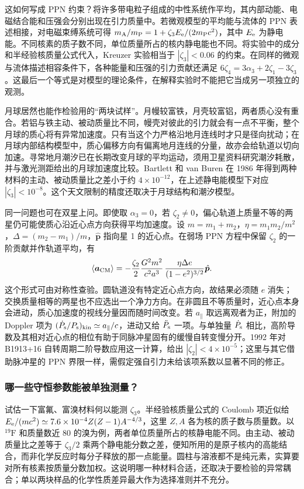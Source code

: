 这如何写成 PPN 约束？将许多带电粒子组成的中性系统作平均，其内部动能、电磁结合能和压强会分别出现在引力质量中。若微观模型的平均能与流体的 PPN 表述相接，对电磁束缚系统可得 $m_{\rm A}/m_{\rm P}=1+\zeta_3 E_{\rm e}/(2m_{\rm P}c^2)$，其中 $E_{\rm e}$ 为静电能。不同核素的质子数不同，单位质量所占的核内静电能也不同。将实验中的成分和半经验核质量公式代入，Kreuzer 实验相当于 $|\zeta_3|<0.06$ 的约束。在同样的微观与流体描述相容条件下，各种能量和压强的引力贡献还满足 $6\zeta_4=3\alpha_3+2\zeta_1-3\zeta_3$。这最后一个等式是对模型的理论条件，在解释实验时不能把它当成另一项独立的观测。

月球居然也能作检验用的“两块试样”。月幔较富铁，月壳较富铝，两者质心没有重合。若铝与铁主动、被动质量比不同，幔壳对彼此的引力就会有一点不平衡，整个月球的质心将有异常加速度。只有当这个力严格沿地月连线时才只是径向扰动；在月球内部结构模型中，质心偏移方向有偏离地月连线的分量，故亦会给轨道以切向加速。寻常地月潮汐已在长期改变月球的平均运动，须用卫星资料研究潮汐耗散，并与激光测距给出的月球加速度比较。Bartlett 和 van Buren 在 1986 年得到两种材料的主动、被动质量比之差小于约 $4\times10^{-12}$，在上述静电能模型下对应 $|\zeta_3|<10^{-8}$。这个天文限制的精度还取决于月球结构和潮汐模型。

同一问题也可在双星上问。即使取 $\alpha_3=0$，若 $\zeta_2\ne0$，偏心轨道上质量不等的两星仍可能使质心沿近心点方向获得平均加速度。设 $m=m_1+m_2$，$\eta=m_1m_2/m^2$，$\Delta=(m_2-m_1)/m$，$\hat{\bm p}$ 指向星 1 的近心点。在弱场 PPN 方程中保留 $\zeta_2$ 的一阶贡献并作轨道平均，有
\[
    \langle\bm a_{\rm CM}\rangle
       =-\frac{\zeta_2}{2}\frac{G^2m^2}{c^2a^3}\,
           \frac{\eta\Delta e}{(1-e^2)^{3/2}}\hat{\bm p}.
\]
这个形式可由对称性查验。圆轨道没有特定近心点方向，故结果必须随 $e$ 消失；交换质量相等的两星也不应选出一个净力方向。在非圆且不等质量时，近心点本身会进动，质心加速度的视线分量因而随时间改变。若 $a_\parallel$ 取远离观者为正，附加的 Doppler 项为 $(\dot P_{\rm s}/P_{\rm s})_{\rm kin}\simeq a_\parallel/c$，进动又给 $\ddot P_{\rm s}$ 一项。与单独量 $\dot P_{\rm s}$ 相比，高阶导数及其相对近心点的相位有助于同脉冲星固有的缓慢自转变慢分开。1992 年对 B1913+16 自转周期二阶导数应用这一计算，给出 $|\zeta_2|<4\times10^{-5}$；这里与其它借助脉冲星的 PPN 界限一样，需假定强自引力未给该项系数以显著不同的修正。


\subsubsection{哪一些守恒参数能被单独测量？}

试估一下富氟、富溴材料何以能测 $\zeta_3$。半经验核质量公式的 Coulomb 项近似给 $E_{\rm e}/(mc^2)\simeq7.6\times10^{-4}Z(Z-1)A^{-4/3}$，这里 $Z,A$ 各为核的质子数与质量数。以 $^{19}\mathrm F$ 和质量数近 $80$ 的溴为例，两者单位质量所占的核静电能不同。由主动、被动质量比之差等于 $\zeta_3/2$ 乘两个静电能分数之差，便知所用的是原子核内的高能结合，而非化学反应时每分子释放的那一点能量。圆柱与溶液都不是纯元素，实算要对所有核素按质量分数加权。这说明哪一种材料合适，还取决于要检验的异常耦合；单以两块样品的化学性质差异最大作为选择准则并不充分。

